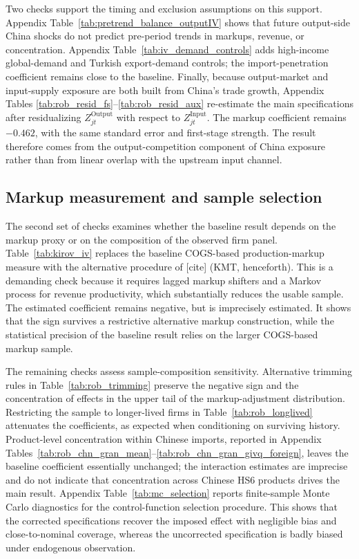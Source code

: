 \documentclass[12pt]{article}
\newcommand{\textcite}[2][]{[cite]}
\begin{document}
Two checks support the timing and exclusion assumptions on this support. Appendix Table~\ref{tab:pretrend_balance_outputIV} shows that future output-side China shocks do not predict pre-period trends in markups, revenue, or concentration. Appendix Table~\ref{tab:iv_demand_controls} adds high-income global-demand and Turkish export-demand controls; the import-penetration coefficient remains close to the baseline. Finally, because output-market and input-supply exposure are both built from China's trade growth, Appendix Tables \ref{tab:rob_resid_fs}--\ref{tab:rob_resid_aux} re-estimate the main specifications after residualizing \(Z^{\text{Output}}_{jt}\) with respect to \(Z^{\text{Input}}_{jt}\). The markup coefficient remains $-0.462$, with the same standard error and first-stage strength. The result therefore comes from the output-competition component of China exposure rather than from linear overlap with the upstream input channel.

\subsection{Markup measurement and sample selection}

The second set of checks examines whether the baseline result depends on the markup proxy or on the composition of the observed firm panel. Table~\ref{tab:kirov_iv} replaces the baseline COGS-based production-markup measure with the alternative procedure of \textcite{kirovMeasuringMarkupsRevenue2026} (KMT, henceforth). This is a demanding check because it requires lagged markup shifters and a Markov process for revenue productivity, which substantially reduces the usable sample. The estimated coefficient remains negative, but is imprecisely estimated. It shows that the sign survives a restrictive alternative markup construction, while the statistical precision of the baseline result relies on the larger COGS-based markup sample.

The remaining checks assess sample-composition sensitivity. Alternative trimming rules in Table~\ref{tab:rob_trimming} preserve the negative sign and the concentration of effects in the upper tail of the markup-adjustment distribution. Restricting the sample to longer-lived firms in Table~\ref{tab:rob_longlived} attenuates the coefficients, as expected when conditioning on surviving history. Product-level concentration within Chinese imports, reported in Appendix Tables~\ref{tab:rob_chn_gran_mean}--\ref{tab:rob_chn_gran_givq_foreign}, leaves the baseline coefficient essentially unchanged; the interaction estimates are imprecise and do not indicate that concentration across Chinese HS6 products drives the main result. Appendix Table~\ref{tab:mc_selection} reports finite-sample Monte Carlo diagnostics for the control-function selection procedure. This shows that the corrected specifications recover the imposed effect with negligible bias and close-to-nominal coverage, whereas the uncorrected specification is badly biased under endogenous observation.
\end{document}
